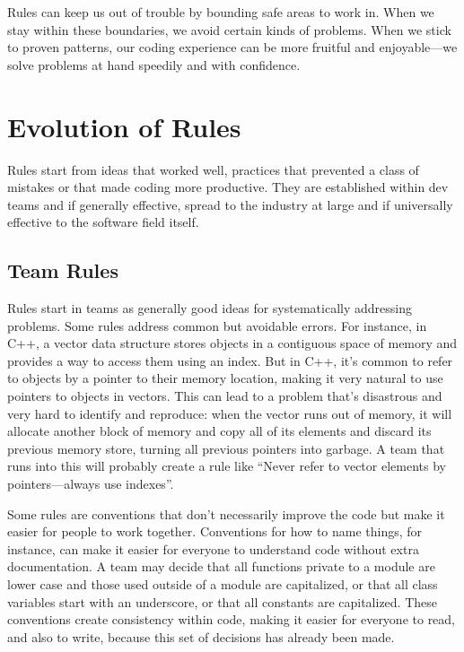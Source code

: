Rules can keep us out of trouble by bounding safe areas to work in. When we
stay within these boundaries, we avoid certain kinds of problems. When we stick
to proven patterns, our coding experience can be more fruitful and
enjoyable---we solve problems at hand speedily and with confidence.

\section{Evolution of Rules}

Rules start from ideas that worked well, practices that prevented a class of
mistakes or that made coding more productive. They are established within dev
teams and if generally effective, spread to the industry at large and if
universally effective to the software field itself.

\subsection{Team Rules}

Rules start in teams as generally good ideas for systematically addressing
problems. Some rules address common but avoidable errors. For instance, in C++,
a vector data structure stores objects in a contiguous space of memory and
provides a way to access them using an index. But in C++, it's common to
refer to objects by a pointer to their memory location, making it very natural
to use pointers to objects in vectors. This can lead to a problem that's
disastrous and very hard to identify and reproduce: when the vector runs out of
memory, it will allocate another block of memory and copy all of its elements
and discard its previous memory store, turning all previous pointers into
garbage. A team that runs into this will probably create a rule like ``Never
refer to vector elements by pointers---always use indexes''.

Some rules are conventions that don't necessarily improve the code but make it
easier for people to work together. Conventions for how to name things, for
instance, can make it easier for everyone to understand code without extra
documentation. A team may decide that all functions private to a module are
lower case and those used outside of a module are capitalized, or that all
class variables start with an underscore, or that all constants are
capitalized. These conventions create consistency within code, making it easier
for everyone to read, and also to write, because this set of decisions has
already been made.

